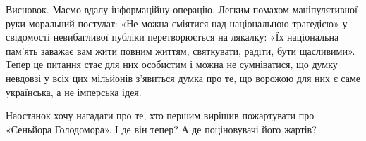 Висновок. Маємо вдалу інформаційну операцію. Легким помахом маніпулятивної руки
моральний постулат: «Не можна сміятися над національною трагедією» у свідомості
невибагливої публіки перетворюється на лякалку: «Їх національна пам’ять заважає
вам жити повним життям, святкувати, радіти, бути щасливими». Тепер це питання
стає для них особистим і можна не сумніватися, що думку невдовзі у всіх цих
мільйонів з’явиться думка про те, що ворожою для них є саме українська, а не
імперська ідея.  

Наостанок хочу нагадати про те, хто першим вирішив пожартувати про «Сеньйора
Голодомора». І де він тепер? А де поціновувачі його жартів?

